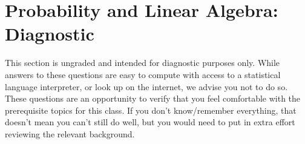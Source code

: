 \documentclass[11pt]{article}
\renewcommand{\vec}[1]{\mathbf{#1}}
\begin{document}


 


\pagebreak
\section{Probability and Linear Algebra: Diagnostic}
This section is ungraded and intended for diagnostic purposes only.
While answers to these questions are easy to compute with access to a statistical language interpreter, or look up on the internet, we advise you not to do so.
These questions are an opportunity to verify that you feel comfortable with the prerequisite topics for this class. If you don't know/remember everything, that doesn't mean you can't still do well, but you would need to put in extra effort reviewing the relevant background.
\end{document}
